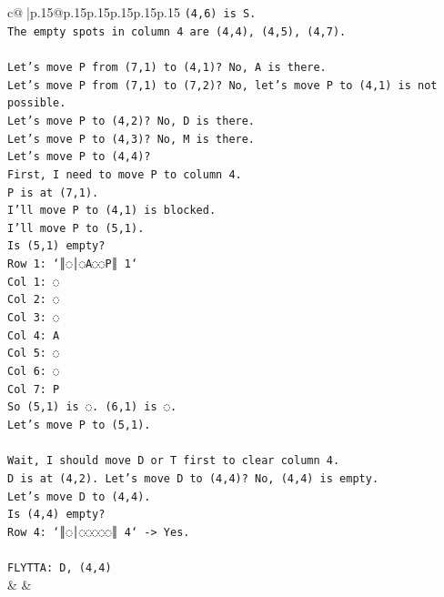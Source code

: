 \documentclass{article}
\begin{document}
{\begin{supertabular}{c@{$\;$}|p{.15\linewidth}@{}p{.15\linewidth}p{.15\linewidth}p{.15\linewidth}p{.15\linewidth}p{.15\linewidth}}
{{{\texttt{(4,6) is S.} \\
\texttt{The empty spots in column 4 are (4,4), (4,5), (4,7).} \\
\\ 
\texttt{Let's move P from (7,1) to (4,1)? No, A is there.} \\
\texttt{Let's move P from (7,1) to (7,2)? No, let's move P to (4,1) is not possible.} \\
\texttt{Let's move P to (4,2)? No, D is there.} \\
\texttt{Let's move P to (4,3)? No, M is there.} \\
\texttt{Let's move P to (4,4)?} \\
\texttt{First, I need to move P to column 4.} \\
\texttt{P is at (7,1).} \\
\texttt{I'll move P to (4,1) is blocked.} \\
\texttt{I'll move P to (5,1).} \\
\texttt{Is (5,1) empty?} \\
\texttt{Row 1: `║◌│◌A◌◌P║ 1`} \\
\texttt{Col 1: ◌} \\
\texttt{Col 2: ◌} \\
\texttt{Col 3: ◌} \\
\texttt{Col 4: A} \\
\texttt{Col 5: ◌} \\
\texttt{Col 6: ◌} \\
\texttt{Col 7: P} \\
\texttt{So (5,1) is ◌. (6,1) is ◌.} \\
\texttt{Let's move P to (5,1).} \\
\\ 
\texttt{Wait, I should move D or T first to clear column 4.} \\
\texttt{D is at (4,2). Let's move D to (4,4)? No, (4,4) is empty.} \\
\texttt{Let's move D to (4,4).} \\
\texttt{Is (4,4) empty?} \\
\texttt{Row 4: `║◌│◌◌◌◌◌║ 4` {-}> Yes.} \\
\\ 
\texttt{FLYTTA: D, (4,4)} \\
            }
        }
    }
    & & \\ \\


\end{supertabular}}
\end{document}
